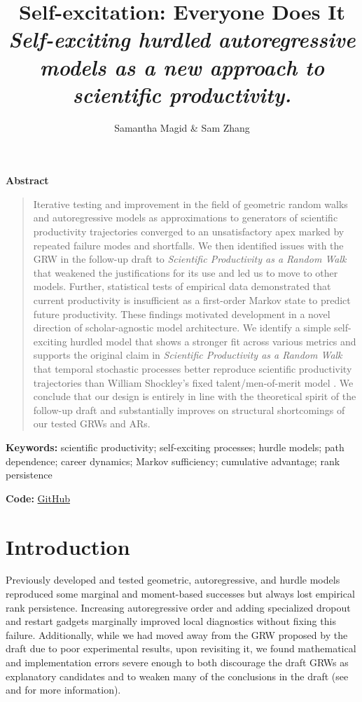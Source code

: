 \documentclass[twocolumn, letterpaper]{article}
\title{Self-excitation: Everyone Does It\\[0.5em]
  \large\textit{Self-exciting hurdled autoregressive models as a new approach to scientific productivity.}}
\author{Samantha Magid \& Sam Zhang}
\begin{document}
\maketitle
\begin{center}
\large{\textbf{Abstract}}
\end{center}

\begin{quote}
Iterative testing and improvement in the field of geometric random walks and autoregressive models as approximations to generators of scientific productivity trajectories converged to an unsatisfactory apex marked by repeated failure modes and shortfalls. We then identified issues with the GRW in the follow-up draft to \textit{Scientific Productivity as a Random Walk} that weakened the justifications for its use and led us to move to other models. Further, statistical tests of empirical data demonstrated that current productivity is insufficient as a first-order Markov state to predict future productivity. These findings motivated development in a novel direction of scholar-agnostic model architecture. We identify a simple self-exciting hurdled model that shows a stronger fit across various metrics and supports the original claim in \textit{Scientific Productivity as a Random Walk} that temporal stochastic processes better reproduce scientific productivity trajectories than William Shockley's fixed talent/men-of-merit model \citep{zhangrandomwalk, shockley1957}. We conclude that our design is entirely in line with the theoretical spirit of the follow-up draft and substantially improves on structural shortcomings of our tested GRWs and ARs.
\end{quote}

\noindent\textbf{Keywords:}
scientific productivity; self-exciting processes; hurdle models;
path dependence; career dynamics; Markov sufficiency;
cumulative advantage; rank persistence

\noindent\textbf{Code:}
\href{https://github.com/crabwife/spaarw_followup}{GitHub}

\section{Introduction}
\label{sec:introduction}
Previously developed and tested geometric, autoregressive, and hurdle models reproduced some marginal and moment-based successes but always lost empirical rank persistence. Increasing autoregressive order and adding specialized dropout and restart gadgets marginally improved local diagnostics without fixing this failure. Additionally, while we had moved away from the GRW proposed by the draft due to poor experimental results, upon revisiting it, we found mathematical and implementation errors severe enough to both discourage the draft GRWs as explanatory candidates and to weaken many of the conclusions in the draft (see  and  for more information).
\end{document}
